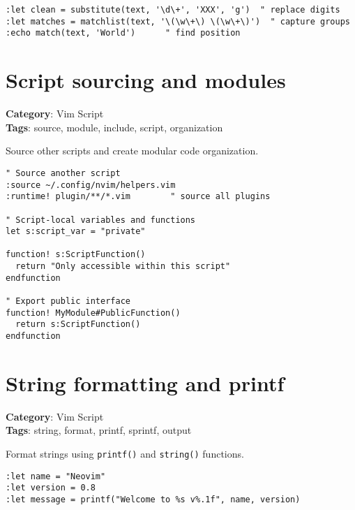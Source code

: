 {{{{{{{{{{{{{{{{{{\begin{Exa*}{}
\begin{Verbatim}[fontsize=\footnotesize, breaklines, breakanywhere]
:let clean = substitute(text, '\d\+', 'XXX', 'g')  " replace digits
:let matches = matchlist(text, '\(\w\+\) \(\w\+\)')  " capture groups
:echo match(text, 'World')      " find position
\end{Verbatim}
\end{Exa*}

\section{Script sourcing and modules}

\textbf{Category}: Vim Script\\ \textbf{Tags}: source, module, include, script, organization
\vspace{0.5cm}

Source other scripts and create modular code organization.

\begin{Exa*}{}
\begin{Verbatim}[fontsize=\footnotesize, breaklines, breakanywhere]
" Source another script
:source ~/.config/nvim/helpers.vim
:runtime! plugin/**/*.vim        " source all plugins

" Script-local variables and functions
let s:script_var = "private"

function! s:ScriptFunction()
  return "Only accessible within this script"
endfunction

" Export public interface
function! MyModule#PublicFunction()
  return s:ScriptFunction()
endfunction
\end{Verbatim}
\end{Exa*}

\section{String formatting and printf}

\textbf{Category}: Vim Script\\ \textbf{Tags}: string, format, printf, sprintf, output
\vspace{0.5cm}

Format strings using {\footnotesize \Verb§printf()§} and {\footnotesize \Verb§string()§} functions.

\begin{Exa*}{}
\begin{Verbatim}[fontsize=\footnotesize, breaklines, breakanywhere]
:let name = "Neovim"
:let version = 0.8
:let message = printf("Welcome to %s v%.1f", name, version)


\end{Verbatim}
\end{Exa*}}}}}}}}}}}}}}}}}}}
